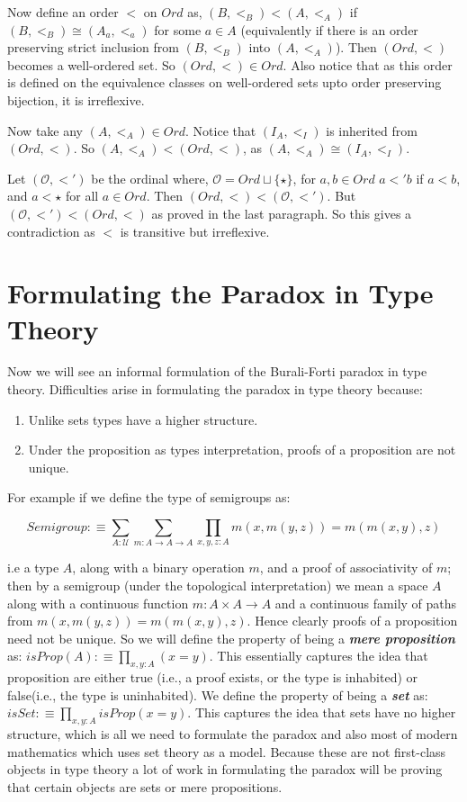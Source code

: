 \documentclass[10pt]{article}
\theoremstyle{definition}
\theoremstyle{plain}
\theoremstyle{remark}
\newcommand{\U}{\mathscr{U}}
\begin{document}
Now define an order $<$ on $Ord$ as, $(B,<_B) < (A, <_A)$ if $(B, <_B) \cong (A_a, <_a)$ 
for some $a \in A$ (equivalently if there is an order preserving strict inclusion 
from $(B,<_B)$ into $(A,<_A)$). Then $(Ord, <)$ becomes a well-ordered set. 
So $(Ord, <) \in Ord$. Also notice that as this order is defined 
on the equivalence classes on well-ordered sets upto order preserving bijection, it is 
irreflexive.\smallskip

Now take any $(A, <_A)\in Ord$. Notice that $(I_A, <_I)$ is inherited from ${(Ord, <)}$. So
$(A, <_A) < (Ord, <)$, as $(A,<_A) \cong (I_A, <_I)$.\smallskip

Let $(\mathcal{O}, <')$ be the ordinal where, $\mathcal{O} = Ord\sqcup \{\star\}$, for 
$a,b\in Ord$ $a<'b$ if $a<b$, and $a<\star$ for all $a\in Ord$. Then 
$(Ord,<)< (\mathcal{O},<')$. But $(\mathcal{O},<')<(Ord,<)$ as proved in the last paragraph.
So this gives a contradiction as $<$ is transitive but irreflexive. 

\section{Formulating the Paradox in Type Theory}\label{S:Form in TT}

Now we will see an informal formulation of the Burali-Forti paradox in type theory. 
Difficulties arise in formulating the paradox in type theory because:
\begin{enumerate}
\item Unlike sets types have a higher structure.
\item Under the proposition as types interpretation, proofs of a proposition are not unique.
\end{enumerate}

For example if we define the type of semigroups as:

\[ {Semigroup}:\equiv 	\sum_{A : \U} \sum_{m : A \to A \to A} 
    \prod_{x,y,z:A} m(x,m(y,z)) = m(m(x,y),z) \]
    
i.e a type $A$, along with a binary operation $m$, and a proof of associativity of $m$; then
by a semigroup (under the topological interpretation) we mean a space $A$ along with a
continuous function $m : A\times A \to A$ and a continuous family of paths from 
$m(x,m(y,z)) = m(m(x,y),z)$. Hence clearly proofs of a proposition need not be unique. So
we will define the property of being a \textbf{\textit{mere proposition}} as:
${ {isProp}(A) :\equiv \prod_{x,y : A} (x = y) }$. This essentially captures the idea
that proposition are either true (i.e., a proof exists, or the type is inhabited) or false(i.e.,
the type is uninhabited). We define the property of being a \textbf{\textit{set}} as: 
${ {isSet} :\equiv \prod_{x,y:A} {isProp}(x=y)  }$. This captures the idea that sets
have no higher structure, which is all we need to formulate the paradox and also most of
modern mathematics which uses set theory as a model. Because these are not first-class 
objects in type theory a lot of work in formulating the paradox will be proving that certain
objects are sets or mere propositions.\smallskip
\end{document}
